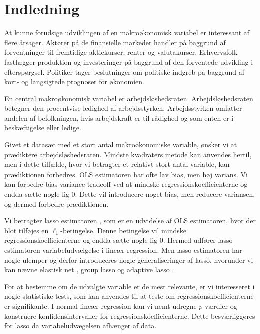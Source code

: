 \chapter{Indledning}
At kunne forudsige udviklingen af en makroøkonomisk variabel er interessant af flere årsager.
Aktører på de finansielle markeder handler på baggrund af forventninger til fremtidige aktiekurser, renter og valutakurser.
Erhvervsfolk fastlægger produktion og investeringer på baggrund af den forventede udvikling i efterspørgsel.
Politiker tager beslutninger om politiske indgreb på baggrund af kort- og langsigtede prognoser for økonomien.

En central makroøkonomisk variabel er arbejdsløshedsraten.
Arbejdsløshedsraten betegner den procentvise ledighed af arbejdsstyrken.
Arbejdsstyrken omfatter andelen af befolkningen, hvis arbejdskraft er til rådighed og som enten er i beskæftigelse eller ledige.

Givet et datasæt med et stort antal makroøkonomiske variable, ønsker vi at prædiktere arbejdsløshedsraten.
Mindste kvadraters metode kan anvendes hertil, men i dette tilfælde, hvor vi betragter et relativt stort antal variable, kan prædiktionen forbedres.
OLS estimatoren har ofte lav bias, men høj varians.
Vi kan forbedre bias-variance tradeoff ved at mindske regressionskoefficienterne og endda sætte nogle lig 0.
Dette vil introducere noget bias, men reducere variansen, og dermed forbedre prædiktionen.

Vi betragter lasso estimatoren \citep{lasso}, som er en udvidelse af OLS estimatoren, hvor der blot tilføjes en \(\ell_1\)-betingelse.
Denne betingelse vil mindske regressionskoefficienterne og endda sætte nogle lig 0.
Hermed udfører lasso estimatoren variabeludvælgelse i lineær regression.
Men lasso estimatoren har nogle ulemper og derfor introduceres nogle generaliseringer af lasso, hvorunder vi kan nævne elastisk net \citep{zou_hastie}, group lasso \citep{group_lasso} og adaptive lasso \citep{adaptive_lasso}.

For at bestemme om de udvalgte variable er de mest relevante, er vi interesseret i nogle statistiske tests, som kan anvendes til at teste om regressionskoefficienterne er signifikante.
I normal lineær regression kan vi nemt udregne \(p\)-værdier og konstruere konfidensintervaller for regressionskoefficienterne.
Dette besværliggøres for lasso da variabeludvægelsen afhænger af data.


